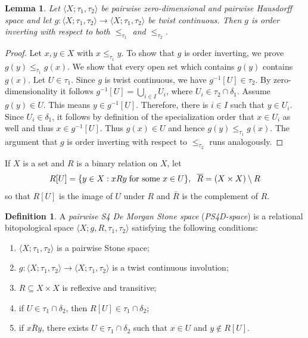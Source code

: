 \documentclass{amsart}
\theoremstyle{plain}
\newtheorem{lemma}[theorem]{Lemma}
\newcommand{\tuple}[1]{\ensuremath{\langle{#1}\rangle}}
\theoremstyle{definition}
\newtheorem{definition}[theorem]{Definition}
\begin{document}
\begin{lemma}
 Let $\langle X; \tau_1, \tau_2 \rangle$ be pairwise zero-dimensional and pairwise Hausdorff space and let $g\colon \tuple{X;\tau_1,\tau_2}\to\tuple{X;\tau_1,\tau_2}$ be twist continuous. Then $g$ is order inverting with respect to both $\leq_{\tau_1}$ and $\leq_{\tau_2}$.
\end{lemma}

\begin{proof}

Let $x,y \in X$ with $x \leq_{\tau_1} y$. To show that $g$ is order inverting, we prove $g(y) \leq_{\tau_1} g(x)$. We show that every open set which contains $g(y)$ contains $g(x)$. Let $U \in \tau_1$. Since $g$ is twist continuous, we have $g^{-1}[U] \in \tau_2$. By zero-dimensionality it follows $g^{-1}[U] =\bigcup_{i \in I} U_i$, where $U_i \in \tau_2 \cap \delta_1$. Assume $g(y) \in U$. This means $y \in g^{-1}[U]$. Therefore, there is $i \in I$ such that $y \in U_i$. Since $U_i \in \delta_1$, it follows by definition of the specialization order that $x \in U_i$ as well and thus $x \in  g^{-1}[U]$. Thus $g(x) \in U$ and hence $g(y) \leq_{\tau_1} g(x)$. The argument that $g$ is order inverting with respect to $\leq_{\tau_2}$ runs analogously. 
\end{proof}

If $X$ is a set and $R$ is a binary relation on $X$, let \[R[U]=\{y\in X:xRy\hspace{.1cm}\text{for some $x\in U$}\},\hspace{.2cm}\overline{R}=(X\times X)\setminus R\] so that $R[U]$ is the image of $U$ under $R$ and $\overline{R}$ is the complement of $R$. 

\begin{definition} \label{pairwise S4 De Morgan space}
    A \emph{pairwise S4 De Morgan Stone space} (\emph{PS4D-space}) is a relational bitopological space $\langle X;g,R,\tau_1,\tau_2\rangle$ satisfying the following conditions: 
    \begin{enumerate}
        \item $\tuple{X;\tau_1,\tau_2}$ is a pairwise Stone space;   
        \item $g\colon \langle X; \tau_1, \tau_2 \rangle\to \langle X; \tau_1,\tau_2 \rangle$ is a twist continuous involution;   
        \item $R\subseteq X\times X$ is reflexive and transitive; 
        \item if $U\in\tau_1\cap\delta_2$, then $R[U]\in\tau_1\cap\delta_2$;
        \item if $x\overline{R}y$, there exists $U\in\tau_1\cap\delta_2$ such that $x\in U$ and $y\not\in R[U]$.
    \end{enumerate}
\end{definition} 
\end{document}
